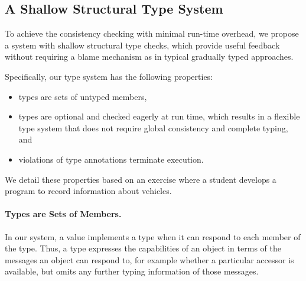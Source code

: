 

\subsection{A Shallow Structural Type System}

To achieve the consistency checking with minimal run-time overhead,
we propose a system with shallow structural type checks,
which provide useful feedback without requiring a blame mechanism
as in typical gradually typed approaches.


Specifically, our type system has the following properties:

\begin{itemize}
  \item types are sets of untyped members,
  \item types are optional and checked eagerly at run time,
        which results in a flexible type system that does not require global
        consistency and complete typing, and
  \item violations of type annotations terminate execution.
\end{itemize}


We detail these properties
based on an exercise where a student develops
a program to record information about vehicles.

\paragraph{Types are Sets of Members.}

In our system, a value implements a type when it
can respond to each member of the type.
Thus, a type expresses the capabilities
of an object in terms of the messages an object
can respond to, for example whether a particular accessor is
available, but omits any further typing information of those messages.

